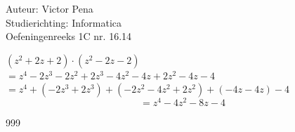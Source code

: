 \documentclass[a4paper]{article}
\begin{document}
	

\noindent \large Auteur: Victor Pena \\
\noindent \large Studierichting: Informatica\\
\noindent \large Oefeningenreeks 1C nr. 16.14\\
	
\medskip
	
\normalsize
	
$ (z^2 + 2z + 2)\cdot (z^2 - 2z -2)$\\

$= z^4 -2z^3 - 2z^2 + 2z^3 - 4z^2 - 4z + 2z^2 - 4z - 4 $\\

$= z^4 + (-2z^3 + 2z^3 ) + ( -2z^2 - 4z^2 + 2z^2 ) + ( -4z - 4z ) - 4 $ \\

$$= z^4 - 4z^2 - 8z - 4 $$
	
	
\begin{thebibliography}{999}
\end{thebibliography}
\end{document}
